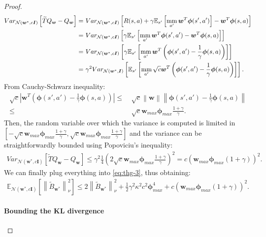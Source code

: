 \documentclass{article}
\newcommand{\mm}{\operatornamewithlimits{mm}}
\newcommand{\wt}[1]{\widetilde{#1}}
\newcommand{\norm}[1]{\left\lVert #1 \right\rVert}
\newcommand{\abs}[1]{\left\lvert #1 \right\rvert}
\begin{document}
\begin{proof}
\begin{align*}
Var_{\mathcal{N}(\bm{w}^*,c\bm{I})}\left[\wt{T}Q_{\bm{w}}-Q_{\bm{w}}\right] =\ & Var_{\mathcal{N}(\bm{w}^*,c\bm{I})}\left[R(s,a) + \gamma\mathbb{E}_{s'}\left[\mm_{a'}\bm{w}^T\bm{\phi}(s',a')\right] - \bm{w}^T\bm{\phi}(s,a)\right]\\ =\ & Var_{\mathcal{N}(\bm{w}^*,c\bm{I})}\left[\gamma\mathbb{E}_{s'}\left[\mm_{a'}\bm{w}^T\bm{\phi}(s',a') - \bm{w}^T\bm{\phi}(s,a)\right]\right]\\ =\ & Var_{\mathcal{N}(\bm{w}^*,c\bm{I})}\left[\gamma\mathbb{E}_{s'}\left[\mm_{a'}\bm{w}^T\left(\bm{\phi}(s',a')-\frac{1}{\gamma}\bm{\phi}(s,a)\right)\right]\right]\\ =\ & \gamma^2 Var_{\mathcal{N}(\bm{w}^*,\bm{I})}\left[\mathbb{E}_{s'}\left[\mm_{a'}\sqrt{c}\bm{w}^T\left(\bm{\phi}(s',a')-\frac{1}{\gamma}\bm{\phi}(s,a)\right)\right]\right].
\end{align*}
From Cauchy-Schwarz inequality:
\begin{align*}
\sqrt{c}\abs{\bm{w}^T\left(\bm{\phi}(s',a')-\frac{1}{\gamma}\bm{\phi}(s,a)\right)} \leq\ & \sqrt{c}\norm{\bm{w}}\norm{\bm{\phi}(s',a')-\frac{1}{\gamma}\bm{\phi}(s,a)}\\ \leq\ & \sqrt{c}\bm{w}_{max}\bm{\phi}_{max}\frac{1 + \gamma}{\gamma}.
\end{align*}
Then, the random variable over which the variance is computed is limited in $[-\sqrt{c}\bm{w}_{max}\bm{\phi}_{max}\frac{1 + \gamma}{\gamma},\sqrt{c}\bm{w}_{max}\bm{\phi}_{max}\frac{1 + \gamma}{\gamma}]$ and the variance can be straightforwardly bounded using Popoviciu's inequality:
\begin{align*}
Var_{\mathcal{N}(\bm{w}^*,c\bm{I})}\left[\wt{T}Q_{\bm{w}}-Q_{\bm{w}}\right] \leq \gamma^2 \frac{1}{4}\left(2\sqrt{c}\bm{w}_{max}\bm{\phi}_{max}\frac{1 + \gamma}{\gamma}\right)^2 = c\left(\bm{w}_{max}\bm{\phi}_{max}(1 + \gamma)\right)^2.
\end{align*}
We can finally plug everything into \eqref{eq:thg-3}, thus obtaining:
\begin{align*}
\mathbb{E}_{\mathcal{N}(\bm{w}^*,c\bm{I})}\left[\norm{\wt{B}_{\bm{w}^{*}}}_{\nu}^2\right] \leq 2\norm{\wt{B}_{\bm{w}^*}}_{\nu}^2 + \frac{1}{2}\gamma^2\kappa^2 c^2\bm{\phi}_{max}^4 + c\left(\bm{w}_{max}\bm{\phi}_{max}(1 + \gamma)\right)^2.
\end{align*}

\paragraph*{Bounding the KL divergence}


\end{proof}
\end{document}
